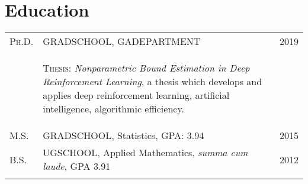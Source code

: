 \documentclass[a4paper,10pt]{article}
\begin{document}
\section{Education}
\begin{supertabular}{p{1.5cm}p{13.9cm}>{\raggedleft\arraybackslash}p{1.5cm}}
	\textsc{Ph.D.} & \textsc{GRADSCHOOL}, \small GADEPARTMENT 			
	& 	\textsc{2019} \\
	& \begin{enumerate*}[label =$\circ$, itemjoin={\newline}] 
	\item \footnotesize \textsc{Thesis:} \emph{Nonparametric Bound Estimation in Deep Reinforcement Learning}, a thesis which develops and applies deep reinforcement learning, artificial intelligence, algorithmic efficiency. 
	\end{enumerate*} 														
	& \\
	\textsc{M.S.} & \textsc{GRADSCHOOL}, \small Statistics, GPA: 3.94  	
	& 	\textsc{2015} 	\\
	\textsc{B.S.} & \textsc{UGSCHOOL}, \small Applied Mathematics, \emph{summa cum laude}, GPA 3.91 
	&	\textsc{2012} 	\\
	 \\
\end{supertabular}



\end{document}

